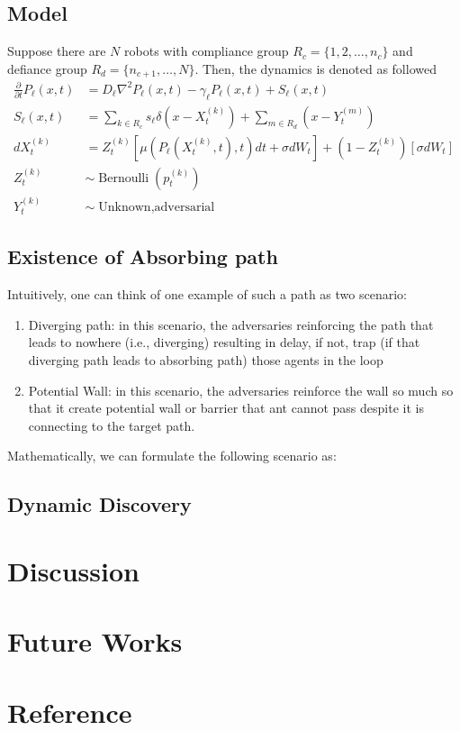 \documentclass[12pt]{article}
\begin{document}
\subsection{Model}
Suppose there are $N$ robots with compliance group $R_c = \{1,2,\dots,n_c\}$ and defiance group $R_d = \{n_{c+1},\dots,N\}$. Then, the dynamics is denoted as followed
\begin{align*}
  \frac{\partial}{\partial t} P_{\ell}(x,t) &= D_\ell \nabla^2 P_\ell (x,t) - \gamma_\ell P_\ell(x,t) + S_{\ell}(x,t)\\
  S_\ell(x,t) &= \sum_{k\in R_c} s_\ell\delta(x-X_t^{(k)}) + \sum_{m\in R_d}(x-Y_t^{(m)})\\
  dX_t^{(k)} &= Z_t^{(k)}\left[\mu(P_\ell(X_t^{(k)},t),t)dt + \sigma dW_t\right] + (1-Z_t^{(k)})\left[\sigma dW_t\right]\\
  Z_t^{(k)} &\sim \operatorname{Bernoulli}(p^{(k)}_t)\\
  Y_t^{(k)} &\sim \operatorname{Unknown, adversarial}
\end{align*}
\subsection{Existence of Absorbing path}
Intuitively, one can think of one example of such a path as two scenario:
\begin{enumerate}
    \item Diverging path: in this scenario, the adversaries reinforcing the path that leads to nowhere (i.e., diverging) resulting in delay, if not, trap (if that diverging path leads to absorbing path) those agents in the loop
    \item Potential Wall: in this scenario, the adversaries reinforce the wall so much so that it create potential wall or barrier that ant cannot pass despite it is connecting to the target path.
\end{enumerate}
Mathematically, we can formulate the following scenario as:
\subsection{Dynamic Discovery}
\section{Discussion}
\section{Future Works}
\section{Reference}
\end{document}
